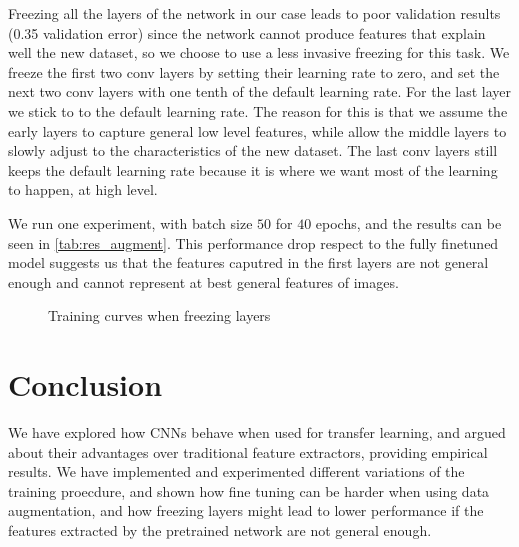 \documentclass{article}
\begin{document}
Freezing all the layers of the network in our case leads to poor validation results (0.35 validation error) since the network cannot produce features that explain well the new dataset, so we choose to use a less invasive freezing for this task. We freeze the first two conv layers by setting their learning rate to zero, and set the next two conv layers with one tenth of the default learning rate. For the last layer we stick to to the default learning rate. The reason for this is that we assume the early layers to capture general low level features, while allow the middle layers to slowly adjust to the characteristics of the new dataset. The last conv layers still keeps the default learning rate because it is where we want most of the learning to happen, at high level.

We run one experiment, with batch size $50$ for $40$ epochs, and the results can be seen in \cref{tab:res_augment}. This performance drop respect to the fully finetuned model suggests us that the features caputred in the first layers are not general enough and cannot represent at best general features of images.

\begin{figure}[h]
    \centering
    \caption{Training curves when freezing layers}

\label{fig:augment}
\end{figure}

\section{Conclusion}

We have explored how CNNs behave when used for transfer learning, and argued about their advantages over traditional feature extractors, providing empirical results. We have implemented and experimented different variations of the training proecdure, and shown how fine tuning can be harder when using data augmentation, and how freezing layers might lead to lower performance if the features extracted by the pretrained network are not general enough.
\end{document}
